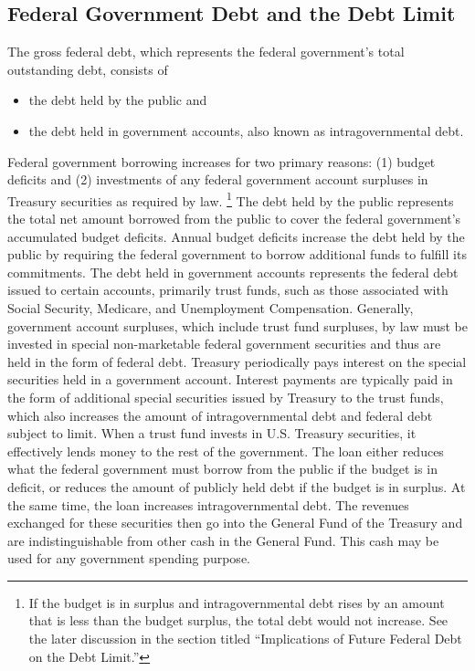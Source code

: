 \subsection{Federal Government Debt and the Debt Limit}
The gross federal debt, which represents the federal government’s total outstanding debt, consists of
\begin{itemize}
\item the debt held by the public and
\item the debt held in government accounts, also known as intragovernmental debt.
\end{itemize}
Federal government borrowing increases for two primary reasons: (1) budget deficits and
(2) investments of any federal government account surpluses in Treasury securities as required by law. \footnote{If the budget is in surplus and intragovernmental debt rises by an amount that is less than the budget surplus, the total debt would not increase. See the later discussion in the section titled “Implications of Future Federal Debt on the
Debt Limit.”}
\newline \newline
The debt held by the public represents the total net amount borrowed from the public to cover the federal government’s accumulated budget deficits. Annual budget deficits increase the debt held by the public by requiring the federal government to borrow additional funds to fulfill its commitments.
\newline \newline
The debt held in government accounts represents the federal debt issued to certain accounts, primarily trust funds, such as those associated with Social Security, Medicare, and Unemployment Compensation. Generally, government account surpluses, which include trust fund surpluses, by law must be invested in special non-marketable federal government securities and thus are held in the form of federal debt. Treasury periodically pays interest on the special securities held in a government account. Interest payments are typically paid in the form of additional special securities issued by Treasury to the trust funds, which also increases the amount of intragovernmental debt and federal debt subject to limit.
\newline \newline
When a trust fund invests in U.S. Treasury securities, it effectively lends money to the rest of the government. The loan either reduces what the federal government must borrow from the public if the budget is in deficit, or reduces the amount of publicly held debt if the budget is in surplus. At the same time, the loan increases intragovernmental debt. The revenues exchanged for these securities then go into the General Fund of the Treasury and are indistinguishable from other cash in the General Fund. This cash may be used for any government spending purpose.

